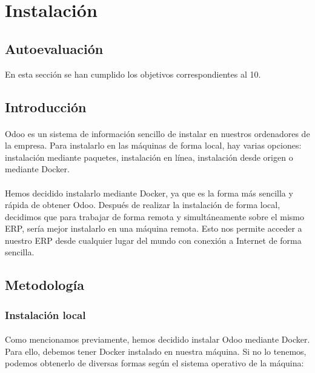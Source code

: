 \section{Instalación}
\subsection{Autoevaluación}
En esta sección se han cumplido los objetivos correspondientes al 10.

\subsection{Introducción}
\paragraph{}
Odoo es un sistema de información sencillo de instalar en nuestros ordenadores de la empresa. Para instalarlo en las máquinas de forma local, hay varias opciones: instalación mediante paquetes, instalación en línea, instalación desde origen o mediante Docker.
\paragraph{}
Hemos decidido instalarlo mediante Docker, ya que es la forma más sencilla y rápida de obtener Odoo. Después de realizar la instalación de forma local, decidimos que para trabajar de forma remota y simultáneamente sobre el mismo ERP, sería mejor instalarlo en una máquina remota. Esto nos permite acceder a nuestro ERP desde cualquier lugar del mundo con conexión a Internet de forma sencilla.

\subsection{Metodología}

\subsubsection{Instalación local}
\paragraph{}
Como mencionamos previamente, hemos decidido instalar Odoo mediante Docker. Para ello, debemos tener Docker instalado en nuestra máquina. Si no lo tenemos, podemos obtenerlo de diversas formas según el sistema operativo de la máquina:

